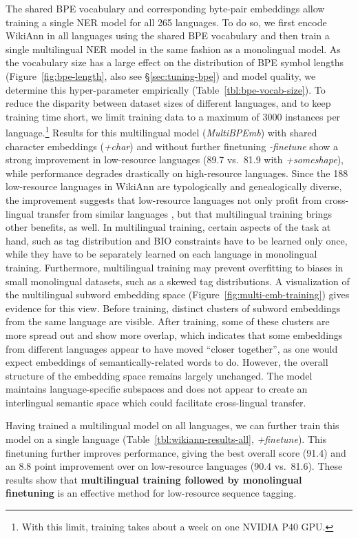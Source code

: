 \documentclass[11pt,a4paper]{article}
\newcommand\secref[1]{\S\ref{#1}}
\begin{document}
The shared BPE vocabulary and corresponding byte-pair embeddings allow training a single NER model for all 265 languages.
To do so, we first encode WikiAnn in all languages using the shared BPE vocabulary and then train a single multilingual NER model in the same fashion as a monolingual model.
As the vocabulary size has a large effect on the distribution of BPE symbol lengths (Figure~\ref{fig:bpe-length}, also see \secref{sec:tuning-bpe}) and model quality, we determine this hyper-parameter empirically (Table~\ref{tbl:bpe-vocab-size}).
To reduce the disparity between dataset sizes of different languages, and to keep training time short, we limit training data to a maximum of 3000 instances per language.\footnote{With this limit, training takes about a week on one NVIDIA P40 GPU.}
Results for this multilingual model (\emph{MultiBPEmb}) with shared character embeddings (\emph{+char}) and without further finetuning \emph{-finetune} show a strong improvement in low-resource languages (89.7 vs.\ 81.9 with \emph{+someshape}), while performance degrades drastically on high-resource languages.
Since the 188 low-resource languages in WikiAnn are typologically and genealogically diverse, the improvement suggests that low-resource languages not only profit from cross-lingual transfer from similar languages \citep{cotterell2017crosslingual}, but that multilingual training brings other benefits, as well.
In multilingual training, certain aspects of the task at hand, such as tag distribution and BIO constraints have to be learned only once, while they have to be separately learned on each language in monolingual training.
Furthermore, multilingual training may prevent overfitting to biases in small monolingual datasets, such as a skewed tag distributions.
A visualization of the multilingual subword embedding space (Figure~\ref{fig:multi-emb-training}) gives evidence for this view.
Before training, distinct clusters of subword embeddings from the same language are visible.
After training, some of these clusters are more spread out and show more overlap, which indicates that some embeddings from different languages appear to have moved ``closer together'', as one would expect embeddings of semantically-related words to do.
However, the overall structure of the embedding space remains largely unchanged.
The model maintains language-specific subspaces and does not appear to create an interlingual semantic space which could facilitate cross-lingual transfer.

Having trained a multilingual model on all languages, we can further train this model on a single language (Table~\ref{tbl:wikiann-results-all}, \emph{+finetune}).
This finetuning further improves performance, giving the best overall score (91.4) and an 8.8 point improvement over \citeauthor{pan2017crosslingual} on low-resource languages (90.4 vs.\ 81.6).
These results show that \textbf{multilingual training followed by monolingual finetuning} is an effective method for low-resource sequence tagging.
\end{document}
